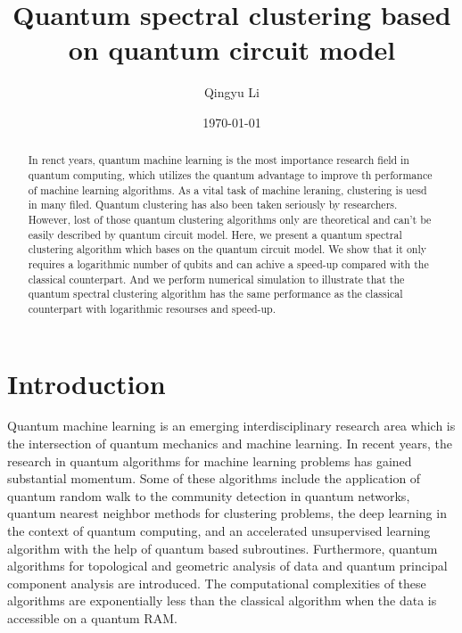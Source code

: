 \documentclass[twocolumn,notitlepage]{revtex4-1}
\begin{document}
\title{Quantum spectral clustering based on quantum circuit model}

\author{Qingyu Li}

\date{\today}


\begin{abstract}
In renct years, quantum machine learning is the most importance research field in quantum computing, which utilizes the quantum advantage to improve th performance of machine learning algorithms. As a vital task of machine leraning, clustering is uesd in many filed. Quantum clustering has also been taken seriously by researchers. However, lost of those quantum clustering algorithms only are theoretical and can't be easily described by quantum circuit model. Here, we present a quantum spectral clustering algorithm which bases on the quantum circuit model. We show that it only requires a logarithmic number of qubits and can achive a speed-up compared with the classical counterpart. And we perform numerical simulation to illustrate that the quantum spectral clustering algorithm has the same performance as the classical counterpart with logarithmic resourses and speed-up.
\end{abstract}


\maketitle
\section{Introduction}






Quantum machine learning is an emerging interdisciplinary research area which is the intersection of quantum mechanics and machine learning. 
In recent years, the research in quantum algorithms for machine learning problems has gained substantial momentum. 
Some of these algorithms include the application of quantum random walk to the community detection in quantum networks, quantum nearest neighbor methods for clustering problems, the deep learning in the context of quantum computing, and an accelerated unsupervised learning algorithm with the help of quantum based subroutines. 
Furthermore, quantum algorithms for topological and geometric analysis of data and quantum principal component analysis are introduced. 
The computational complexities of these algorithms are exponentially less than the classical algorithm when the data is accessible on a quantum RAM.
\end{document}
